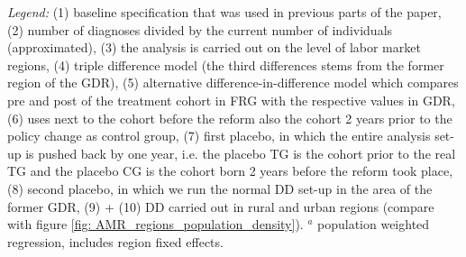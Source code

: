 \begin{landscape}
\begin{table}[htbp]
\begin{minipage}{0.87\linewidth}
		\newline \emph{Legend:} (1) baseline specification that was used in previous parts of the paper, (2) number of diagnoses divided by the current number of individuals (approximated), (3) the analysis is carried out on the level of labor market regions, (4) triple difference model (the third differences stems from the former region of the GDR), (5) alternative difference-in-difference model which compares pre and post of the treatment cohort in FRG with the respective values in GDR, (6) uses next to the cohort before the reform also the cohort 2 years prior to the policy change as control group, (7) first placebo, in which the entire analysis set-up is pushed back by one year, i.e. the placebo TG is the cohort prior to the real TG and the placebo CG is the cohort born 2 years before the reform took place, (8) second placebo, in which we run the normal DD set-up in the area of the former GDR, (9) + (10)  DD carried out in rural and urban regions (compare with figure \ref{fig: AMR_regions_population_density}). \newline
		\hspace{10 pt}$^a$ population weighted regression, includes region fixed effects.
	\end{minipage}
\end{table} 
	\vspace*{\fill}\clearpage
\end{landscape}






